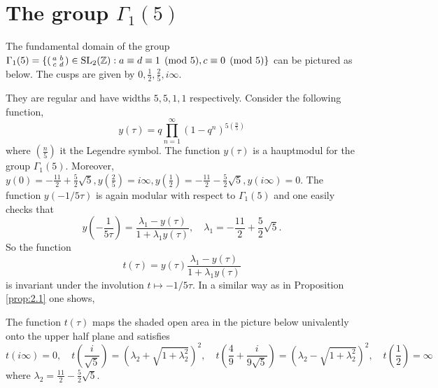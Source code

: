 \section{The group $\Gamma_1(5)$}

The fundamental domain of the group $\Gamma_1(5) = \{ (\begin{smallmatrix}
    a & b \\ c & d
\end{smallmatrix}) \in \mathrm{SL}_2(\mathbb{Z}): a \equiv d \equiv 1 \pmod{5}, c \equiv 0\pmod{5}\}$ can be pictured as below.
The cusps are given by $0, \frac{1}{2}, \frac{2}{5}, i\infty$.
\begin{center}
\end{center}
They are regular and have widths $5, 5, 1, 1$ respectively.
Consider the following function,
$$
y(\tau) = q \prod_{n = 1}^{\infty} (1 - q^n)^{5 \left(\frac{n}{5}\right)}
$$
where $\left(\frac{n}{5} \right)$ it the Legendre symbol.
The function $y(\tau)$ is a hauptmodul for the group $\Gamma_1(5)$.
Moreover, $y(0) = - \frac{11}{2} + \frac{5}{2} \sqrt{5}, y(\frac{2}{5}) = i\infty, y(\frac{1}{2}) = -\frac{11}{2} - \frac{5}{2} \sqrt{5}, y(i\infty) = 0$.
The function $y(-1/5\tau)$ is again modular with respect to $\Gamma_1(5)$ and one easily checks that
$$
y\left(-\frac{1}{5 \tau}\right) = \frac{\lambda_1 - y(\tau)}{1 + \lambda_1 y(\tau)}, \quad \lambda_1 = -\frac{11}{2} + \frac{5}{2} \sqrt{5}.
$$
So the function
$$
    t(\tau) = y(\tau) \frac{\lambda_1 - y(\tau)}{1 + \lambda_1 y(\tau)}
$$
is invariant under the involution $t \mapsto -1 / 5\tau$.
In a similar way as in Proposition \ref{prop:2.1} one shows,

\begin{proposition}
\label{prop:3.1}
The function $t(\tau)$ maps the shaded open area in the picture below univalently onto the upper half plane and satisfies
$$
    t(i\infty) = 0, \quad t\left(\frac{i}{\sqrt{5}}\right) = (\lambda_2 + \sqrt{1 + \lambda_2^2})^2, \quad t \left(\frac{4}{9} + \frac{i}{9\sqrt{5}}\right) = (\lambda_2 - \sqrt{1 + \lambda_2^2})^2, \quad t\left(\frac{1}{2}\right) = \infty
$$
where $\lambda_2 = \frac{11}{2} - \frac{5}{2} \sqrt{5}$.
\end{proposition}

